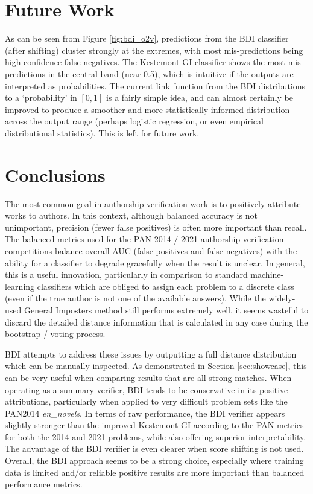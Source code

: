 \documentclass[
    hf
]{ceurart}
\begin{document}
\section{Future Work}

As can be seen from Figure \ref{fig:bdi_o2v}, predictions from the BDI classifier (after shifting)
cluster strongly at the extremes, with most mis-predictions being high-confidence false negatives.
The Kestemont GI classifier shows the most mis-predictions in the central band (near 0.5), which is
intuitive if the outputs are interpreted as probabilities. The current link function from the BDI
distributions to a `probability' in $[0,1]$ is a fairly simple idea, and can almost certainly be
improved to produce a smoother and more statistically informed distribution across the output range
(perhaps logistic regression, or even empirical distributional statistics). This is left for future
work.

\section{Conclusions}

The most common goal in authorship verification work is to positively attribute works to authors. In
this context, although balanced accuracy is not unimportant, precision (fewer false positives) is
often more important than recall. The balanced metrics used for the PAN 2014 / 2021 authorship
verification competitions balance overall AUC (false positives and false negatives) with the ability
for a classifier to degrade gracefully when the result is unclear. In general, this is a useful
innovation, particularly in comparison to standard machine-learning classifiers which are obliged to
assign each problem to a discrete class (even if the true author is not one of the available
answers). While the widely-used General Imposters method still performs extremely well, it seems
wasteful to discard the detailed distance information that is calculated in any case during the
bootstrap / voting process.

BDI attempts to address these issues by outputting a full distance distribution which can be
manually inspected. As demonstrated in Section \ref{sec:showcase}, this can be very useful when
comparing results that are all strong matches. When operating as a summary verifier, BDI tends to be
conservative in its positive attributions, particularly when applied to very difficult problem sets
like the PAN2014 \textit{en\_novels}. In terms of raw performance, the BDI verifier appears slightly
stronger than the improved Kestemont GI according to the PAN metrics for both the 2014 and 2021
problems, while also offering superior interpretability. The advantage of the BDI verifier is even
clearer when score shifting is not used. Overall, the BDI approach seems to be a strong choice,
especially where training data is limited and/or reliable positive results are more important than
balanced performance metrics. 
\end{document}
